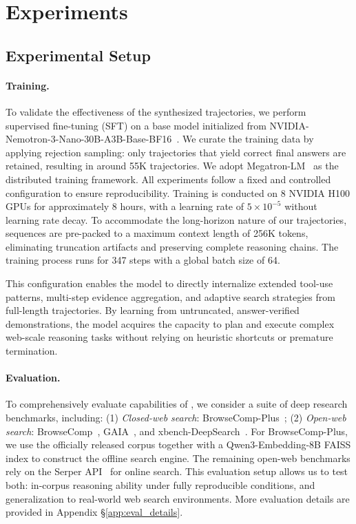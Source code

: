 

\section{Experiments}
\label{sec:exp}

\subsection{Experimental Setup}
\paragraph{Training.}
\label{subsec:sft}
To validate the effectiveness of the synthesized trajectories, we perform supervised fine-tuning (SFT) on a base model initialized from {NVIDIA-Nemotron-3-Nano-30B-A3B-Base-BF16}~\citep{blakeman2025nemotron}. We curate the training data by applying rejection sampling: only trajectories that yield correct final answers are retained, resulting in around 55K trajectories. We adopt {Megatron-LM}~\citep{megatron-lm} as the distributed training framework. All experiments follow a fixed and controlled configuration to ensure reproducibility. Training is conducted on 8 NVIDIA H100 GPUs for approximately 8 hours, with a learning rate of $5\times10^{-5}$ without learning rate decay. To accommodate the long-horizon nature of our trajectories, sequences are pre-packed to a maximum context length of 256K tokens, eliminating truncation artifacts and preserving complete reasoning chains. The training process runs for 347 steps with a global batch size of 64.

This configuration enables the model to directly internalize extended tool-use patterns, multi-step evidence aggregation, and adaptive search strategies from full-length trajectories. By learning from untruncated, answer-verified demonstrations, the model acquires the capacity to plan and execute complex web-scale reasoning tasks without relying on heuristic shortcuts or premature termination.

\paragraph{Evaluation. }
\label{sec:exp-setup} To comprehensively evaluate capabilities of \model, 
we consider a suite of deep research benchmarks, including: (1) \textit{Closed-web search}: BrowseComp-Plus~\citep{chen2025BrowseCompPlus}; (2) \textit{Open-web search}: BrowseComp~\citep{wei2025browsecomp}, GAIA~\citep{mialon2023gaia}, and xbench-DeepSearch~\citep{chen2025xbench}. For BrowseComp-Plus, we use the officially released corpus together with a Qwen3-Embedding-8B FAISS index to construct the offline search engine. The remaining open-web benchmarks rely on the Serper API~\citep{serperdev2026} for online search. This evaluation setup allows us to test both: in-corpus reasoning ability under fully reproducible conditions, and generalization to real-world web search environments. More evaluation details are provided in Appendix \S\ref{app:eval_details}.

